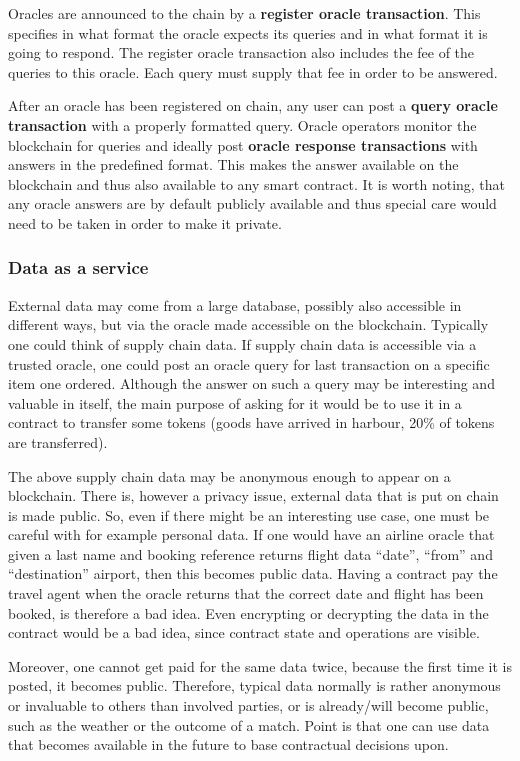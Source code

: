 Oracles are announced to the chain by a \textbf{register oracle transaction}.
This specifies in what format the oracle expects its queries and in what format
it is going to respond. The register oracle transaction also includes the fee
of the queries to this oracle. Each query must supply that fee in order to be
answered.

After an oracle has been registered on chain, any user can post a \textbf{query
oracle transaction} with a properly formatted query.
Oracle operators monitor the blockchain for queries and ideally post
\textbf{oracle response transactions} with answers in the predefined format.
This makes the answer available on the blockchain and thus also available to
any smart contract.
It is worth noting, that any oracle answers are by default publicly available
and thus special care would need to be taken in order to make it private.

\subsubsection{Data as a service}

External data may come from a large database, possibly also accessible in
different
ways, but via the oracle made accessible on the blockchain. Typically
one could think of supply chain data. If supply chain data is
accessible via a trusted oracle, one could post an oracle query for
last transaction on a specific item one ordered. Although the answer
on such a query may be interesting and valuable in itself, the main
purpose of asking for it would be to use it in a contract to transfer
some tokens (goods have arrived in harbour, 20\%  of tokens are
transferred).

The above supply chain data may be anonymous enough to appear on a
blockchain. There is, however a privacy issue, external data that is
put on chain is made public. So, even if there might be an interesting
use case, one must be careful with for example personal data. If one
would have an airline oracle that given a last name and booking
reference returns flight data ``date'', ``from'' and ``destination''
airport, then this becomes public data. Having a contract pay the
travel agent when the oracle returns that the correct date and flight has
been booked, is therefore a bad idea. Even encrypting or decrypting the
data in the contract would be a bad idea, since contract state and
operations are visible.

Moreover, one cannot get paid for the same data twice, because the
first time it is posted, it becomes public. Therefore, typical data
normally is rather anonymous or invaluable to others than involved
parties, or is already/will become public, such as the weather or the
outcome of a match. Point is that one can use data that becomes
available in the future to base contractual decisions upon.

